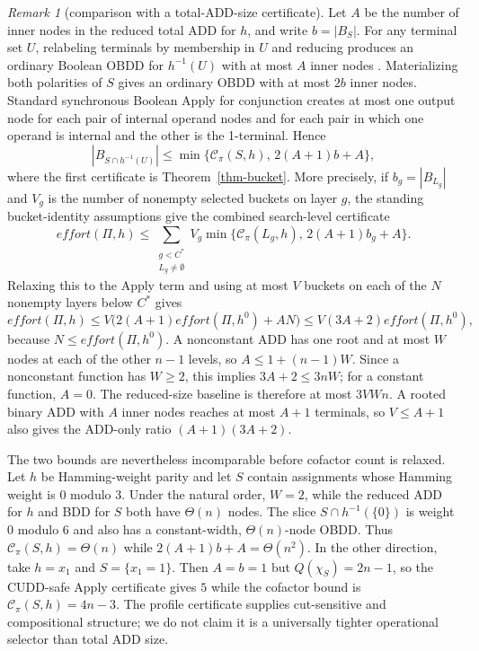 \documentclass[letterpaper]{article}
\newcommand{\task}{\ensuremath{\Pi}}
\newcommand{\hblind}{\ensuremath{h^{0}}}
\newcommand{\copt}{\ensuremath{C^{*}}}
\newcommand{\bddsize}[1]{\ensuremath{|B_{#1}|}}
\newcommand{\cofcount}{\ensuremath{Q}}
\newcommand{\cutprod}[2]{\ensuremath{\mathcal{C}_{\pi}(#1,#2)}}
\newcommand{\values}{\ensuremath{V}}
\newcommand{\effort}{\ensuremath{\mathit{effort}}}
\theoremstyle{plain}
\theoremstyle{definition}
\theoremstyle{remark}
\newtheorem{remark}{Remark}
\begin{document}
\begin{remark}[comparison with a total-ADD-size certificate]
Let $A$ be the number of inner nodes in the reduced total ADD for $h$, and
write $b=\bddsize{S}$. For any terminal set $U$, relabeling terminals by
membership in $U$ and reducing produces an ordinary Boolean OBDD for
$h^{-1}(U)$ with at most $A$ inner nodes
\citep[Sec.~9.2]{wegener-2000}. Materializing both
polarities of $S$ gives an ordinary OBDD with at most $2b$ inner nodes.
Standard synchronous Boolean Apply for conjunction
\citep[Sec.~4.3]{bryant-ieeecomp1986} creates at most one output node for
each pair of internal operand nodes and for each pair in which one operand is
internal and the other is the 1-terminal.
Hence
\[
 \bddsize{S\cap h^{-1}(U)}
 \leq\min\{\cutprod{S}{h},\,2(A+1)b+A\},
\]
where the first certificate is Theorem~\ref{thm-bucket}.  More precisely, if
$b_g=\bddsize{L_g}$ and $\values_g$ is the number of nonempty selected
buckets on layer $g$, the standing bucket-identity assumptions give the
combined search-level certificate
\[
 \effort(\task,h)
 \leq\sum_{\substack{g<\copt\\L_g\ne\emptyset}}
 \values_g\min\{\cutprod{L_g}{h},\,2(A+1)b_g+A\}.
\]
Relaxing this to the Apply term and using at most $\values$ buckets on each
of the $N$ nonempty layers below $\copt$ gives
\[
 \effort(\task,h)
 \leq\values\bigl(2(A+1)\effort(\task,\hblind)+AN\bigr)
 \leq\values(3A+2)\effort(\task,\hblind),
\]
because $N\leq\effort(\task,\hblind)$. A nonconstant ADD has one root and at
most $W$ nodes at each of the other $n-1$ levels, so
$A\leq1+(n-1)W$. Since a nonconstant function has $W\geq2$, this implies
$3A+2\leq3nW$; for a constant function, $A=0$. The reduced-size baseline is
therefore at most $3\values Wn$. A rooted binary ADD
with $A$ inner nodes reaches at most
$A+1$ terminals, so $\values\leq A+1$ also gives the ADD-only ratio
$(A+1)(3A+2)$.

The two bounds are nevertheless incomparable before cofactor count is relaxed.
Let $h$ be Hamming-weight parity and let $S$ contain assignments whose Hamming
weight is $0$ modulo $3$. Under the natural order, $W=2$, while the reduced
ADD for $h$ and BDD for $S$ both have $\Theta(n)$ nodes. The slice
$S\cap h^{-1}(\{0\})$ is weight $0$ modulo $6$ and also has a constant-width,
$\Theta(n)$-node OBDD.
Thus $\cutprod{S}{h}=\Theta(n)$ while $2(A+1)b+A=\Theta(n^2)$. In the other
direction, take $h=x_1$ and $S=\{x_1=1\}$. Then $A=b=1$ but
$\cofcount(\chi_S)=2n-1$, so the CUDD-safe Apply certificate gives $5$ while
the cofactor bound is
$\cutprod{S}{h}=4n-3$. The profile certificate supplies cut-sensitive and
compositional structure; we do not claim it is a universally tighter
operational selector than total ADD size.
\end{remark}
\end{document}
